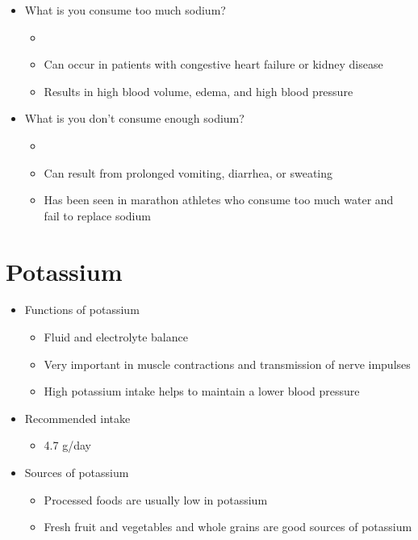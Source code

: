 \documentclass[title={Chapter 7}]{fdsn201notes}
\begin{document}
\begin{itemize}
	\item What is you consume too much sodium?
	\begin{itemize}
		\item {}
		\item Can occur in patients with congestive heart failure or kidney disease
		\item Results in high blood volume, edema, and high blood pressure
	\end{itemize}
	\item What is you don't consume enough sodium?
	\begin{itemize}
		\item {}
		\item Can result from prolonged vomiting, diarrhea, or sweating
		\item Has been seen in marathon athletes who consume too much water and fail to replace sodium
	\end{itemize}
\end{itemize}

\section{Potassium}\label{sec:potassium}
\begin{itemize}
	\item Functions of potassium
	\begin{itemize}
		\item Fluid and electrolyte balance
		\item Very important in muscle contractions and transmission of nerve impulses
		\item High potassium intake helps to maintain a lower blood pressure
	\end{itemize}
	\item Recommended intake
	\begin{itemize}
		\item 4.7 g/day
	\end{itemize}
	\item Sources of potassium
	\begin{itemize}
		\item Processed foods are usually low in potassium
		\item Fresh fruit and vegetables and whole grains are good sources of potassium
	\end{itemize}
\end{itemize}
\end{document}

